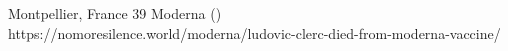           {Montpellier, France}
          {39}
          {Moderna}
          {}
          {
             ()
          }
          {https://nomoresilence.world/moderna/ludovic-clerc-died-from-moderna-vaccine/}

